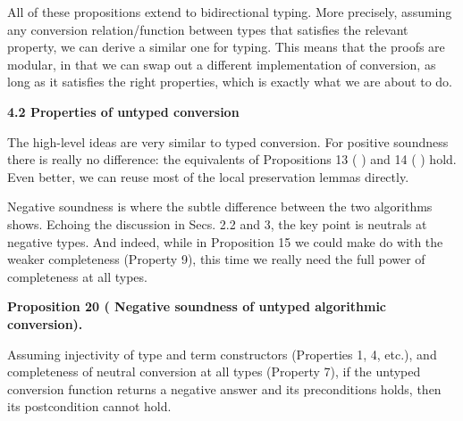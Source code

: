 \documentclass[10pt,a4paper]{amsart}
\begin{document}
 
All of these propositions extend to bidirectional typing. More precisely, assuming any conversion relation/function between types that satisfies the relevant property, we can derive a similar one for typing. This means that the proofs are modular, in that we can swap out a different implementation of conversion, as long as it satisfies the right properties, which is exactly what we are about to do.\par
 
 
 


 
\par\medskip\noindent\textbf{4.2 Properties of untyped conversion}\par
 
 
The high-level ideas are very similar to typed conversion. For positive soundness there is really no difference: the equivalents of Propositions 13 ( ) and 14 ( ) hold. Even better, we can reuse most of the local preservation lemmas directly.\par
 
 
 
Negative soundness is where the subtle difference between the two algorithms shows. Echoing the discussion in Secs. 2.2 and 3, the key point is neutrals at negative types. And indeed, while in Proposition 15 we could make do with the weaker completeness (Property 9), this time we really need the full power of completeness at all types.\par
 
 
 
\par\medskip\noindent\textbf{Proposition 20 (  Negative soundness of untyped algorithmic conversion).}\par
 
 
Assuming injectivity of type and term constructors (Properties 1, 4, etc.), and completeness of neutral conversion at all types (Property 7), if the untyped conversion function returns a negative answer and its preconditions holds, then its postcondition cannot hold.\par
 
\end{document}
